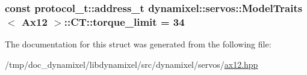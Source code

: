 \subsubsection[{torque\+\_\+limit}]{\setlength{\rightskip}{0pt plus 5cm}const {\bf protocol\+\_\+t\+::address\+\_\+t} {\bf dynamixel\+::servos\+::\+Model\+Traits}$<$ {\bf Ax12} $>$\+::C\+T\+::torque\+\_\+limit = 34\hspace{0.3cm}{\ttfamily [static]}}\label{structdynamixel_1_1servos_1_1_model_traits_3_01_ax12_01_4_1_1_c_t_a1ab6f1b0cb3adf858747828c5011c7c2}


The documentation for this struct was generated from the following file\+:\begin{DoxyCompactItemize}
\item 
/tmp/doc\+\_\+dynamixel/libdynamixel/src/dynamixel/servos/\hyperlink{ax12_8hpp}{ax12.\+hpp}\end{DoxyCompactItemize}
